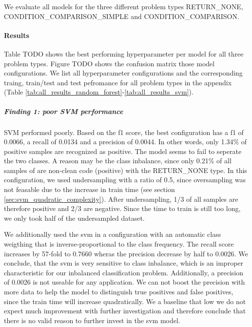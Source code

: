 We evaluate all models for the three different problem types RETURN\_NONE, CONDITION\_COMPARISON\_SIMPLE and CONDITION\_COMPARISON.

\paragraph{Results}
Table TODO shows the best performing hyperparameter per model for all three problem types. Figure TODO shows the confusion matrix those model configurations. We list all hyperparameter configurations and the corresponding traing, train/test and test pefromance for all problem types in the appendix (Table \ref{tab:all_results_random_forest}-\ref{tab:all_results_svm}).




\subparagraph{Finding 1: poor SVM performance}
SVM performed poorly. Based on the f1 score, the best configuration has a f1 of 0.0066, a recall of 0.0134 and a precision of 0.0044. In other words, only 1.34\% of positive samples are recognized as positive. The model seems to fail to seperate the two classes. A reason may be the class inbalance, since only 0.21\% of all samples of are non-clean code (positive) with the RETURN\_NONE type. In this configuration, we used undersampling with a ratio of 0.5, since oversampling was not feasable due to the increase in train time (see section \ref{sec:svm_quadratic_complexity}). After undersampling, 1/3 of all samples are therefore positive and 2/3 are negative. Since the time to train is still too long, we only took half of the undersampled dataset. 

We additionally used the svm in a configuration with an automatic class weigthing that is inverse-proportional to the class frequency. The recall score increases by 57-fold to 0.7660 wheras the precision decrease by half to 0.0026. We conclude, that the svm is very sensitive to class inbalance, which is an improper characteristic for our inbalanced classification problem. Additionally, a precision of 0.0026 is not useable for any application. We can not boost the precision with more data to help the model to distinguish true positives and false positives, since the train time will increase quadratically. We a baseline that low we do not expect much improvement with further investigation and therefore conclude that there is no valid reason to further invest in the svm model.
